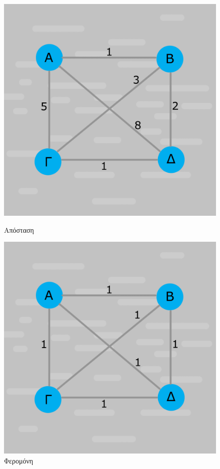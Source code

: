 \begin{figure}[ht]
    \begin{minipage}[c]{.46\linewidth}
        \centering
        \includegraphics[scale=0.15]{2947_thesis/pictures/apostaseis.png}
        \caption{Απόσταση}
    \end{minipage}
    \begin{minipage}[c]{.46\linewidth}
        \centering
        \includegraphics[scale=0.15]{2947_thesis/pictures/feromoni.png}
        \caption{Φερομόνη}
    \end{minipage}
\end{figure}
